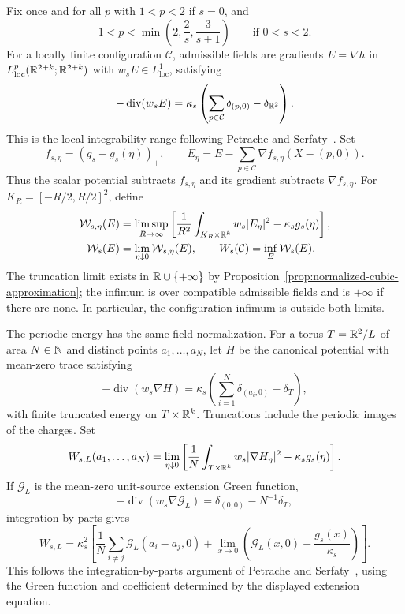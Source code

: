 Fix once and for all $p$ with $1<p<2$ if $s=0$, and
\[
 1<p<\min\left(2,\frac2s,\frac3{s+1}\right)
 \qquad\text{if }0<s<2.
\]
For a locally finite configuration $\mathcal C$, admissible fields are
gradients $E=\nabla h$ in $L^p_{\mathrm{loc}}(\mathbb R^{2+k};\mathbb R^{2+k})$
with $w_sE\in L^1_{\mathrm{loc}}$, satisfying
\[
 -\operatorname{div}(w_sE)
 =\kappa_s\left(\sum_{p\in\mathcal C}\delta_{(p,0)}
                      -\delta_{\mathbb R^2}\right).
\]
This is the local integrability range following
Petrache and Serfaty~\citep[Definition~1.2]{PetracheSerfaty2017}.  Set
\[
 f_{s,\eta}=(g_s-g_s(\eta))_+,
 \qquad E_\eta=E-\sum_{p\in\mathcal C}
                       \nabla f_{s,\eta}(X-(p,0)).
\]
Thus the scalar potential subtracts $f_{s,\eta}$ and its gradient
subtracts $\nabla f_{s,\eta}$.  For $K_R=[-R/2,R/2]^2$, define
\begin{align*}
 \mathcal W_{s,\eta}(E)&=\limsup_{R\to\infty}
 \left[\frac1{R^2}\int_{K_R\times\mathbb R^k}w_s|E_\eta|^2
                         -\kappa_sg_s(\eta)\right],\\
 \mathcal W_s(E)&=\lim_{\eta\downarrow0}\mathcal W_{s,\eta}(E),
 \qquad W_s(\mathcal C)=\inf_E\mathcal W_s(E).
\end{align*}
The truncation limit exists in $\mathbb R\cup\{+\infty\}$ by
Proposition~\ref{prop:normalized-cubic-approximation}; the infimum is over
compatible admissible fields and is $+\infty$ if there are none.
In particular, the configuration infimum is outside both limits.

The periodic energy has the same field normalization.  For a torus
$T=\mathbb R^2/L$ of area $N\in\mathbb N$ and distinct points $a_1,\ldots,a_N$,
let $H$ be the canonical potential with mean-zero trace satisfying
\[
 -\operatorname{div}(w_s\nabla H)
 =\kappa_s\left(\sum_{i=1}^N\delta_{(a_i,0)}-\delta_T\right),
\]
with finite truncated energy on $T\times\mathbb R^k$.  Truncations include
the periodic images of the charges.  Set
\[
 W_{s,L}(a_1,\ldots,a_N)=\lim_{\eta\downarrow0}
 \left[\frac1N\int_{T\times\mathbb R^k}w_s|\nabla H_\eta|^2
                                      -\kappa_sg_s(\eta)\right].
\]
If $\mathcal G_L$ is the mean-zero unit-source extension Green function,
\[
 -\operatorname{div}(w_s\nabla\mathcal G_L)
      =\delta_{(0,0)}-N^{-1}\delta_T,
\]
integration by parts gives
\[
 W_{s,L}=\kappa_s^2\left[
  \frac1N\sum_{i\ne j}\mathcal G_L(a_i-a_j,0)
  +\lim_{x\to0}\left(\mathcal G_L(x,0)-\frac{g_s(x)}{\kappa_s}\right)
 \right].
\]
This follows the integration-by-parts argument of
Petrache and Serfaty~\citep[Proposition~1.5]{PetracheSerfaty2017}, using the Green function
and coefficient determined by the displayed extension equation.

